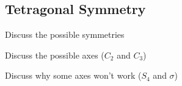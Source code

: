 \subsection{Tetragonal Symmetry}
\label{sec:symmetry}

\bit
\item Discuss the possible symmetries
\item Discuss the possible axes ($C_2$ and $C_3$)
\item Discuss why some axes won't work ($S_4$ and $\sigma$)
\eit

\placeholder
